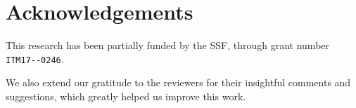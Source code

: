 \section*{Acknowledgements}\label{paper:olguinmunoz2022ainur:acks}

This research has been partially funded by the \gls{SSF}, through grant number \verb|ITM17--0246|.

We also extend our gratitude to the reviewers for their insightful comments and suggestions, which greatly helped us improve this work.
